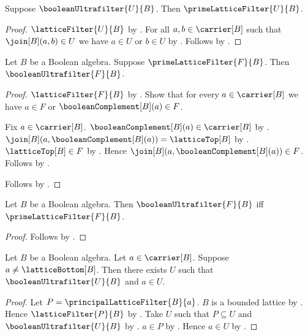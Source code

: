 \begin{theorem}\label{boolean_ultrafilter_is_prime}
    Suppose $\booleanUltrafilter{U}{B}$.
    Then $\primeLatticeFilter{U}{B}$.
\end{theorem}
\begin{proof}
    $\latticeFilter{U}{B}$ by
        .
    For all $a,b\in\carrier[B]$ such that $\join[B](a,b)\in U$
        we have $a\in U$ or $b\in U$ by
        .
    Follows by .
\end{proof}

\begin{theorem}\label{prime_boolean_filter_is_ultrafilter}
    Let $B$ be a Boolean algebra.
    Suppose $\primeLatticeFilter{F}{B}$.
    Then $\booleanUltrafilter{F}{B}$.
\end{theorem}
\begin{proof}
    $\latticeFilter{F}{B}$ by
        .
    Show that for every $a\in\carrier[B]$ we have
        $a\in F$ or $\booleanComplement[B](a)\in F$.
    \begin{subproof}
        Fix $a\in\carrier[B]$.
        $\booleanComplement[B](a)\in\carrier[B]$ by
            .
        $\join[B](a,\booleanComplement[B](a))
            =\latticeTop[B]$ by .
        $\latticeTop[B]\in F$ by .
        Hence $\join[B](a,\booleanComplement[B](a))\in F$.
        Follows by .
    \end{subproof}
    Follows by
        .
\end{proof}

\begin{theorem}\label{boolean_ultrafilter_iff_prime_filter}
    Let $B$ be a Boolean algebra.
    Then $\booleanUltrafilter{F}{B}$ iff
        $\primeLatticeFilter{F}{B}$.
\end{theorem}
\begin{proof}
    Follows by
        .
\end{proof}

\begin{theorem}\label{nonbottom_in_boolean_ultrafilter}
    Let $B$ be a Boolean algebra.
    Let $a\in\carrier[B]$.
    Suppose $a\neq\latticeBottom[B]$.
    Then there exists $U$ such that
        $\booleanUltrafilter{U}{B}$ and $a\in U$.
\end{theorem}
\begin{proof}
    Let $P=\principalLatticeFilter{B}{a}$.
    $B$ is a bounded lattice by
        .
    Hence $\latticeFilter{P}{B}$ by
        .
    Take $U$ such that $P\subseteq U$ and
        $\booleanUltrafilter{U}{B}$ by
        .
    $a\in P$ by
        .
    Hence $a\in U$ by .
\end{proof}

